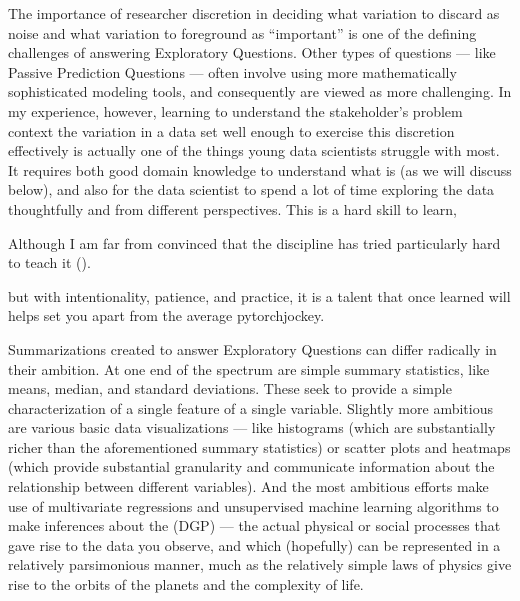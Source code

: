 \documentclass[letterpaper,10pt,english]{jupyterBook}
\begin{document}
\sphinxAtStartPar
The importance of researcher discretion in deciding what variation to discard as noise and what variation to foreground as “important” is one of the defining challenges of answering Exploratory Questions. Other types of questions — like Passive Prediction Questions — often involve using more mathematically sophisticated modeling tools, and consequently are viewed as more challenging. In my experience, however, learning to understand the stakeholder’s problem context  the variation in a data set well enough to exercise this discretion effectively is actually one of the things young data scientists struggle with most. It requires both good domain knowledge to understand what is  (as we will discuss below), and also for the data scientist to spend a lot of time exploring the data thoughtfully and from different perspectives. This is a hard skill to learn,%
\begin{footnote}[1]\sphinxAtStartFootnote
Although I am far from convinced that the discipline has tried particularly hard to teach it ({\hyperref[\detokenize{30_questions/17_exploratory_internal_understandable:07_eda.ipynb}]{}}).
%
\end{footnote} but with intentionality, patience, and practice, it is a talent that once learned will helps set you apart from the average pytorch\sphinxhyphen{}jockey.

\sphinxAtStartPar
Summarizations created to answer Exploratory Questions can differ radically in their ambition. At one end of the spectrum are simple summary statistics, like means, median, and standard deviations. These seek to provide a simple characterization of a single feature of a single variable. Slightly more ambitious are various basic data visualizations — like histograms (which are substantially richer than the aforementioned summary statistics) or scatter plots and heatmaps (which provide substantial granularity and communicate information about the relationship between different variables). And the most ambitious efforts make use of multivariate regressions and unsupervised machine learning algorithms to make inferences about the  (DGP) — the actual physical or social processes that gave rise to the data you observe, and which (hopefully) can be represented in a relatively parsimonious manner, much as the relatively simple laws of physics give rise to the orbits of the planets and the complexity of life.
\end{document}

